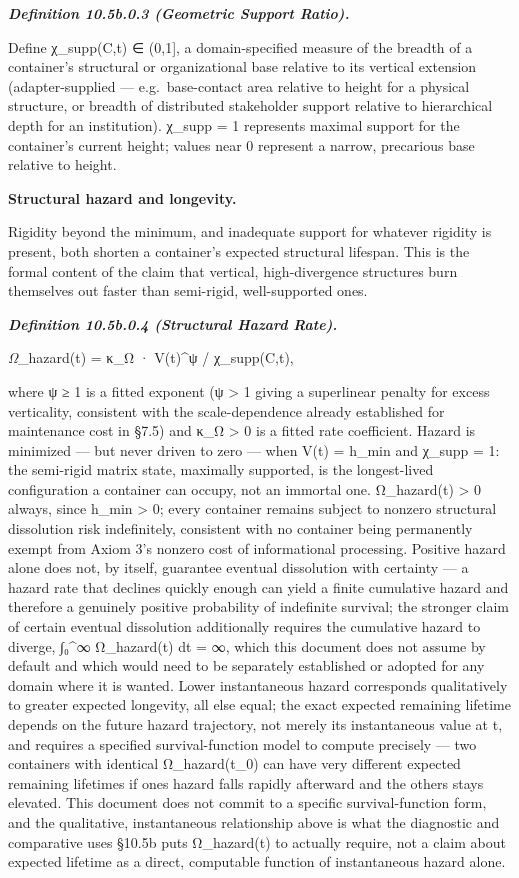 \documentclass[
]{article}
\begin{document}
\emph{\textbf{Definition 10.5b.0.3 (Geometric Support Ratio).}}

Define χ\_supp(C,t) ∈ (0,1{]}, a domain-specified measure of the breadth
of a container's structural or organizational base relative to its
vertical extension (adapter-supplied --- e.g.~base-contact area relative
to height for a physical structure, or breadth of distributed
stakeholder support relative to hierarchical depth for an institution).
χ\_supp = 1 represents maximal support for the container's current
height; values near 0 represent a narrow, precarious base relative to
height.

\textbf{Structural hazard and longevity.}

Rigidity beyond the minimum, and inadequate support for whatever
rigidity is present, both shorten a container's expected structural
lifespan. This is the formal content of the claim that vertical,
high-divergence structures burn themselves out faster than semi-rigid,
well-supported ones.

\emph{\textbf{Definition 10.5b.0.4 (Structural Hazard Rate).}}

\emph{Ω}\_hazard(t) = κ\_Ω · V(t)\^{}ψ / χ\_supp(C,t),

where ψ ≥ 1 is a fitted exponent (ψ \textgreater{} 1 giving a
superlinear penalty for excess verticality, consistent with the
scale-dependence already established for maintenance cost in §7.5) and
κ\_Ω \textgreater{} 0 is a fitted rate coefficient. Hazard is minimized
--- but never driven to zero --- when V(t) = h\_min and χ\_supp = 1: the
semi-rigid matrix state, maximally supported, is the longest-lived
configuration a container can occupy, not an immortal one. Ω\_hazard(t)
\textgreater{} 0 always, since h\_min \textgreater{} 0; every container
remains subject to nonzero structural dissolution risk indefinitely,
consistent with no container being permanently exempt from Axiom 3's
nonzero cost of informational processing. Positive hazard alone does
not, by itself, guarantee eventual dissolution with certainty --- a
hazard rate that declines quickly enough can yield a finite cumulative
hazard and therefore a genuinely positive probability of indefinite
survival; the stronger claim of certain eventual dissolution
additionally requires the cumulative hazard to diverge, ∫₀\^{}∞
Ω\_hazard(t) dt = ∞, which this document does not assume by default and
which would need to be separately established or adopted for any domain
where it is wanted. Lower instantaneous hazard corresponds qualitatively
to greater expected longevity, all else equal; the exact expected
remaining lifetime depends on the future hazard trajectory, not merely
its instantaneous value at t, and requires a specified survival-function
model to compute precisely --- two containers with identical
Ω\_hazard(t\_0) can have very different expected remaining lifetimes if
one\textquotesingle s hazard falls rapidly afterward and the
other\textquotesingle s stays elevated. This document does not commit to
a specific survival-function form, and the qualitative, instantaneous
relationship above is what the diagnostic and comparative uses §10.5b
puts Ω\_hazard(t) to actually require, not a claim about expected
lifetime as a direct, computable function of instantaneous hazard alone.
\end{document}
